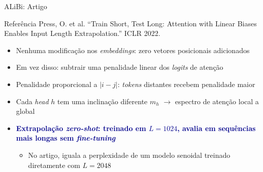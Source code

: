 \documentclass[aspectratio=169, xcolor=dvipsnames]{beamer}
\begin{document}
  \begin{frame}{ALiBi: Artigo}
    \begin{block}{Referência}
      Press, O. et al. ``Train Short, Test Long: Attention with Linear Biases Enables Input Length Extrapolation.'' ICLR 2022.
    \end{block}
    \begin{itemize}
      \item Nenhuma modificação nos \textit{embeddings}: zero vetores posicionais adicionados
      \item Em vez disso: subtrair uma penalidade linear dos \textit{logits} de atenção
      \item Penalidade proporcional a $|i - j|$: \textit{tokens} distantes recebem penalidade maior
      \item Cada \textit{head} $h$ tem uma inclinação diferente $m_h$ $\to$ espectro de atenção local a global
      \item \textcolor{DarkBlue}{\textbf{Extrapolação \textit{zero-shot}: treinado em $L=1024$, avalia em sequências mais longas sem \textit{fine-tuning}}}
      \begin{itemize}
        \item No artigo, iguala a perplexidade de um modelo senoidal treinado diretamente com $L=2048$
      \end{itemize}
    \end{itemize}
  \end{frame}
\end{document}
